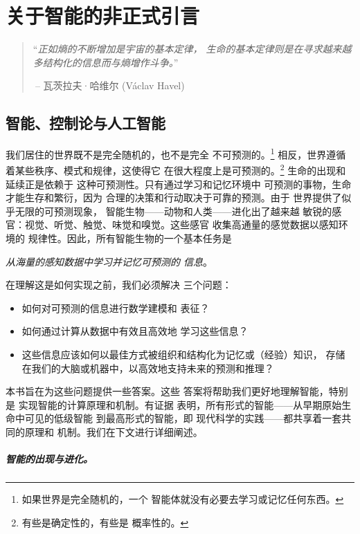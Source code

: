 \documentclass[../../book-main_zh.tex]{subfiles}
\begin{document}
\chapter{关于智能的非正式引言}
\label{ch:intro}

\begin{quote}
    ``{\em 正如熵的不断增加是宇宙的基本定律，
        生命的基本定律则是在寻求越来越多结构化的信息而与熵增作斗争。}''

    $~$\hfill -- 瓦茨拉夫·哈维尔 (V\'{a}clav Havel)
\end{quote}
\vspace{5mm}

\section{智能、控制论与人工智能}
我们居住的世界既不是完全随机的，也不是完全
不可预测的。\footnote{如果世界是完全随机的，一个
智能体就没有必要去学习或记忆任何东西。}
相反，世界遵循着某些秩序、模式和规律，这使得它
在很大程度上是可预测的。\footnote{有些是确定性的，有些是
概率性的。} 生命的出现和延续正是依赖于
这种可预测性。只有通过学习和记忆环境中
可预测的事物，生命才能生存和繁衍，因为
合理的决策和行动取决于可靠的预测。由于
世界提供了似乎无限的可预测现象，
智能生物——动物和人类——进化出了越来越
敏锐的感官：视觉、听觉、触觉、味觉和嗅觉。这些感官
收集高通量的感觉数据以感知环境的
规律性。因此，所有智能生物的一个基本任务是
\begin{center}
    \textit{从海量的感知数据中学习并记忆可预测的
    信息}。
\end{center}
在理解这是如何实现之前，我们必须解决
三个问题：
\begin{itemize}
    \item 如何对可预测的信息进行数学建模和
        表征？
    \item 如何通过计算从数据中有效且高效地
        学习这些信息？
    \item 这些信息应该如何以最佳方式被组织和结构化为记忆或（经验）知识，
    存储在我们的大脑或机器中，以高效地支持未来的预测和推理？
\end{itemize}
本书旨在为这些问题提供一些答案。这些
答案将帮助我们更好地理解智能，特别是
实现智能的计算原理和机制。有证据
表明，所有形式的智能——从早期原始生命中可见的低级智能
到最高形式的智能，即
现代科学的实践——都共享着一套共同的原理和
机制。我们在下文进行详细阐述。

\paragraph{智能的出现与进化。}
\end{document}
